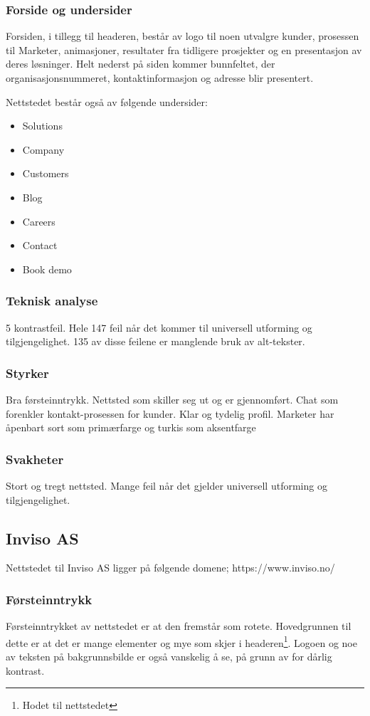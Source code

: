 \subsubsection{Forside og undersider}

Forsiden, i tillegg til headeren, består av logo til noen utvalgre kunder, prosessen til Marketer, animasjoner, resultater fra tidligere prosjekter og en presentasjon av deres løsninger. Helt nederst på siden kommer bunnfeltet, der organisasjonsnummeret, kontaktinformasjon og adresse blir presentert.

Nettstedet består også av følgende undersider:
\begin{itemize}
\item Solutions
\item Company
\item Customers
\item Blog
\item Careers 
\item Contact
\item Book demo
\end{itemize}

\subsubsection{Teknisk analyse}
5 kontrastfeil. Hele 147 feil når det kommer til universell utforming og tilgjengelighet. 135 av disse feilene er manglende bruk av alt-tekster.

\subsubsection{Styrker}
Bra førsteinntrykk. Nettsted som skiller seg ut og er gjennomført. Chat som forenkler kontakt-prosessen for kunder. Klar og tydelig profil. Marketer har åpenbart sort som primærfarge og turkis som aksentfarge

\subsubsection{Svakheter}
Stort og tregt nettsted. Mange feil når det gjelder universell utforming og tilgjengelighet.


\subsection{Inviso AS}
Nettstedet til Inviso AS ligger på følgende domene;
https://www.inviso.no/

\subsubsection{Førsteinntrykk}
Førsteinntrykket av nettstedet er at den fremstår som rotete. Hovedgrunnen til dette er at det er mange elementer og mye som skjer i headeren\footnote{Hodet til nettstedet}. Logoen og noe av teksten på bakgrunnsbilde er også vanskelig å se, på grunn av for dårlig kontrast. 

